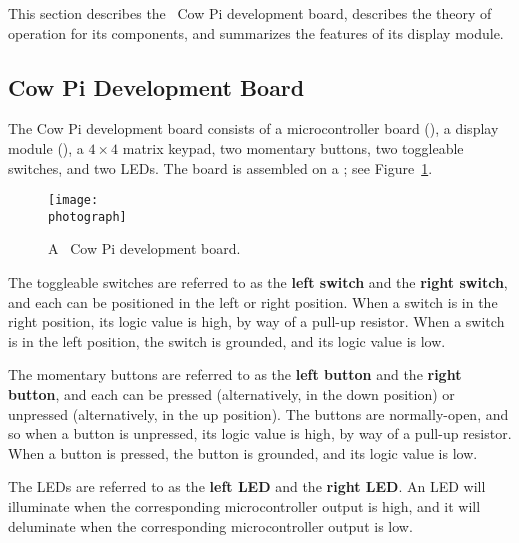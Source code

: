 
This section describes the \hardwareversion\ Cow Pi development board, describes the theory of operation for its components, and summarizes the features of its display module.

\subsection{Cow Pi Development Board}

The Cow Pi development board consists of a microcontroller board (\mcuboard), a display module (\displaymoduledescription), a $4 \times 4$ matrix keypad, two momentary buttons, two toggleable switches, and two LEDs.
The board is assembled on a \construction; see Figure~\ref{fig:photograph}.

\begin{figure}
    \centering
    \texttt{[image: \\photograph]}
    \caption{A \hardwareversion\ Cow Pi development board.}\label{fig:photograph}
\end{figure}

The toggleable switches are referred to as the \textbf{left switch} and the \textbf{right switch}, and each can be positioned in the left or right position.
When a switch is in the right position, its logic value is high, by way of a pull-up resistor.
When a switch is in the left position, the switch is grounded, and its logic value is low.

The momentary buttons are referred to as the \textbf{left button} and the \textbf{right button}, and each can be pressed (alternatively, in the down position) or unpressed (alternatively, in the up position).
The buttons are normally-open, and so when a button is unpressed, its logic value is high, by way of a pull-up resistor.
When a button is pressed, the button is grounded, and its logic value is low.

The LEDs are referred to as the \textbf{left LED} and the \textbf{right LED}.
An LED will illuminate when the corresponding microcontroller output is high, and it will deluminate when the corresponding microcontroller output is low.

